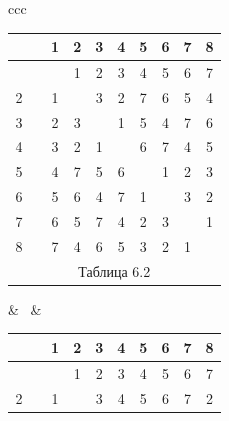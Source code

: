 \begin{center}





\begin{tabular}{ccc}





\begin{tabular}{cccccccccc}


\ & \vline & 1 & 2 & 3 & 4 & 5 & 6 & 7 & 8 \\


\hline


 1 & \vline & \ & 1 & 2 & 3 & 4 & 5 & 6 & 7 \\


2 & \vline & 1 & \ & 3 & 2 & 7 & 6 & 5 & 4 \\


3 & \vline & 2 & 3 & \ & 1 & 5 & 4 & 7 & 6 \\


4 & \vline & 3 & 2 & 1 & \ & 6 & 7 & 4 & 5 \\


5 & \vline & 4 & 7 & 5 & 6 & \ & 1 & 2 & 3 \\


6 & \vline & 5 & 6 & 4 & 7 & 1 & \ & 3 & 2 \\


7 & \vline & 6 & 5 & 7 & 4 & 2 & 3 & \ & 1 \\


8 & \vline & 7 & 4 & 6 & 5 & 3 & 2 & 1 & \ \\


\multicolumn{10}{c}{ Таблица 6.2}


\end{tabular}





& \ & 





\begin{tabular}{cccccccccc}


\ & \vline & 1 & 2 & 3 & 4 & 5 & 6 & 7 & 8 \\


\hline


 1 & \vline & \ & 1 & 2 & 3 & 4 & 5 & 6 & 7 \\


2 & \vline & 1 & \ & 3 & 4 & 5 & 6 & 7 & 2 \\



\end{tabular}
\end{tabular}
\end{center}
